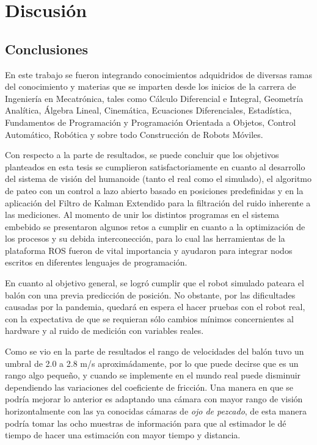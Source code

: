 \chapter{Discusión}
\section{Conclusiones}
	En este trabajo se fueron integrando conocimientos adquidridos de diversas ramas del conocimiento y materias que se imparten desde los inicios de la carrera de Ingeniería en Mecatrónica, tales como Cálculo Diferencial e Integral, Geometría Analítica, Álgebra Lineal, Cinemática, Ecuaciones Diferenciales, Estadística, Fundamentos de Programación y Programación Orientada a Objetos, Control Automático, Robótica y sobre todo Construcción de Robots Móviles.
	
	Con respecto a la parte de resultados, se puede concluir que los objetivos planteados en esta tesis se cumplieron satisfactoriamente en cuanto al desarrollo del sistema de visión del humanoide (tanto el real como el simulado), el algoritmo de pateo con un control a lazo abierto basado en posiciones predefinidas y en la aplicación del Filtro de Kalman Extendido para la filtración del ruido inherente a las mediciones.
	Al momento de unir los distintos programas en el sistema embebido se presentaron algunos retos a cumplir en cuanto a la optimización de los procesos y su debida interconección, para lo cual las herramientas de la plataforma ROS fueron de vital importancia y ayudaron para integrar nodos escritos en diferentes lenguajes de programación.

	En cuanto al objetivo general, se logró cumplir que el robot simulado pateara el balón con una previa predicción de posición. No obstante, por las dificultades causadas por la pandemia, quedará en espera el hacer pruebas con el robot real, con la expectativa de que se requieran sólo cambios mínimos concernientes al hardware y al ruido de medición con variables reales.
	
	Como se vio en la parte de resultados el rango de velocidades del balón tuvo un umbral de 2.0 a 2.8 m/s aproximádamente, por lo que puede decirse que es un rango algo pequeño, y cuando se implemente en el mundo real puede disminuir dependiendo las variaciones del coeficiente de fricción. Una manera en que se podría mejorar lo anterior es adaptando una cámara con mayor rango de visión horizontalmente con las ya conocidas cámaras de \textit{ojo de pezcado}, de esta manera podría tomar las ocho muestras de información para que al estimador le dé tiempo de hacer una estimación con mayor tiempo y distancia.
	
